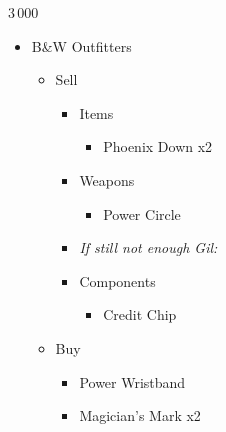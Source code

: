 	\begin{shop}{3\,000}
		\begin{itemize}
			\item B\&W Outfitters
			      \begin{itemize}
				      \item Sell
				            \begin{itemize}
					            \item Items
					                  \begin{itemize}
						                  \item Phoenix Down x2
					                  \end{itemize}
					            \item Weapons
					                  \begin{itemize}
						                  \item Power Circle
					                  \end{itemize}
					            \item \textit{If still not enough Gil:}
					            \item Components
					                  \begin{itemize}
						                  \item Credit Chip
					                  \end{itemize}
				            \end{itemize}
				      \item Buy
				            \begin{itemize}
					            \item Power Wristband
					            \item Magician's Mark x2
				            \end{itemize}
			      \end{itemize}
		\end{itemize}
	\end{shop}
